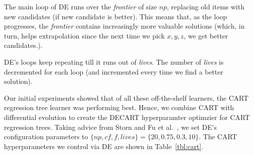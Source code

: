 \documentclass[sigconf,anonymous,review]{acmart}
\begin{document}
 
The main loop of DE runs over the {\em frontier} of size $np$, replacing old items with new candidates (if new candidate is better). This means that, as the loop progresses, the {\em frontier}  contains increasingly more valuable solutions (which, in turn,
helps   extrapolation since the next time we pick $x,y,z$, we get better candidates.). 

DE's loops keep repeating till it runs out of {\em lives}. The number of {\em lives} is decremented for each loop (and  incremented every time we find a better solution).

Our initial  experiments 
showed that of all these off-the-shelf learners, the CART regression tree learner was performing best. Hence, we combine CART with differential evolution to create the DECART hyperparamter  optimzier for CART regression trees. 
Taking advice from  Storn and Fu et al.~\cite{storn1997differential,Fu2016TuningFS}, we set DE's configuration parameters to $\{\mathit{np, cf, f, \mathit{lives}}\}=\{20,0.75,0.3,10\}$. The CART hyperparameters we control via DE are shown in Table~\ref{tbl:cart}.


 


\end{document}
